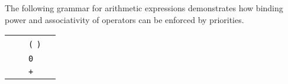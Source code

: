 \begin{isabellebody}
\begin{isamarkuptext}
  \medskip The following grammar for arithmetic expressions
  demonstrates how binding power and associativity of operators can be
  enforced by priorities.

  \begin{center}
  \begin{tabular}{rclr}
  \isa{{\isaliteral{22}{\isachardoublequote}}A\isaliteral{5C3C5E7375703E}{}\isactrlsup {\isaliteral{28}{\isacharparenleft}}\isaliteral{5C3C5E7375703E}{}\isactrlsup {\isadigit{1}}\isaliteral{5C3C5E7375703E}{}\isactrlsup {\isadigit{0}}\isaliteral{5C3C5E7375703E}{}\isactrlsup {\isadigit{0}}\isaliteral{5C3C5E7375703E}{}\isactrlsup {\isadigit{0}}\isaliteral{5C3C5E7375703E}{}\isactrlsup {\isaliteral{29}{\isacharparenright}}{\isaliteral{22}{\isachardoublequote}}} & \isa{{\isaliteral{22}{\isachardoublequote}}{\isaliteral{3D}{\isacharequal}}{\isaliteral{22}{\isachardoublequote}}} & \verb|(| \isa{{\isaliteral{22}{\isachardoublequote}}A\isaliteral{5C3C5E7375703E}{}\isactrlsup {\isaliteral{28}{\isacharparenleft}}\isaliteral{5C3C5E7375703E}{}\isactrlsup {\isadigit{0}}\isaliteral{5C3C5E7375703E}{}\isactrlsup {\isaliteral{29}{\isacharparenright}}{\isaliteral{22}{\isachardoublequote}}} \verb|)| \\
  \isa{{\isaliteral{22}{\isachardoublequote}}A\isaliteral{5C3C5E7375703E}{}\isactrlsup {\isaliteral{28}{\isacharparenleft}}\isaliteral{5C3C5E7375703E}{}\isactrlsup {\isadigit{1}}\isaliteral{5C3C5E7375703E}{}\isactrlsup {\isadigit{0}}\isaliteral{5C3C5E7375703E}{}\isactrlsup {\isadigit{0}}\isaliteral{5C3C5E7375703E}{}\isactrlsup {\isadigit{0}}\isaliteral{5C3C5E7375703E}{}\isactrlsup {\isaliteral{29}{\isacharparenright}}{\isaliteral{22}{\isachardoublequote}}} & \isa{{\isaliteral{22}{\isachardoublequote}}{\isaliteral{3D}{\isacharequal}}{\isaliteral{22}{\isachardoublequote}}} & \verb|0| \\
  \isa{{\isaliteral{22}{\isachardoublequote}}A\isaliteral{5C3C5E7375703E}{}\isactrlsup {\isaliteral{28}{\isacharparenleft}}\isaliteral{5C3C5E7375703E}{}\isactrlsup {\isadigit{0}}\isaliteral{5C3C5E7375703E}{}\isactrlsup {\isaliteral{29}{\isacharparenright}}{\isaliteral{22}{\isachardoublequote}}} & \isa{{\isaliteral{22}{\isachardoublequote}}{\isaliteral{3D}{\isacharequal}}{\isaliteral{22}{\isachardoublequote}}} & \isa{{\isaliteral{22}{\isachardoublequote}}A\isaliteral{5C3C5E7375703E}{}\isactrlsup {\isaliteral{28}{\isacharparenleft}}\isaliteral{5C3C5E7375703E}{}\isactrlsup {\isadigit{0}}\isaliteral{5C3C5E7375703E}{}\isactrlsup {\isaliteral{29}{\isacharparenright}}{\isaliteral{22}{\isachardoublequote}}} \verb|+| \isa{{\isaliteral{22}{\isachardoublequote}}A\isaliteral{5C3C5E7375703E}{}\isactrlsup {\isaliteral{28}{\isacharparenleft}}\isaliteral{5C3C5E7375703E}{}\isactrlsup {\isadigit{1}}\isaliteral{5C3C5E7375703E}{}\isactrlsup {\isaliteral{29}{\isacharparenright}}{\isaliteral{22}{\isachardoublequote}}} \\

\end{tabular}
\end{center}
\end{isamarkuptext}
\end{isabellebody}
